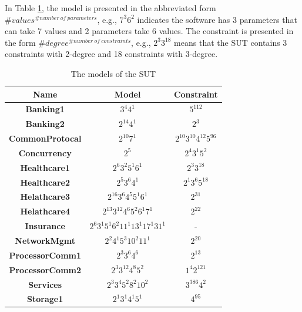\documentclass[conference]{IEEEtran}
\theoremstyle{definition}
\begin{document}
In Table \ref{model_of_sut_of_subjects}, the model is presented in the abbreviated form $\#values^{\#number\ of\ parameters}$, e.g., $7^{3}6^{2}$ indicates the software has 3 parameters that can take 7 values and 2 parameters take 6 values.  The constraint is presented in the form $\#degree^{\#number\ of\ constraints}$, e.g., $2^{3}3^{18}$ means that the SUT contains 3 constraints with  2-degree and 18 constraints with 3-degree.


\begin{table}[!ht]
\caption{The models of the SUT}
\label{model_of_sut_of_subjects}
\center
    \begin{tabular}{|c|c|c|} \hline
    \textbf{Name} & \textbf{Model} & \textbf{Constraint}  \\
    \hline
    \textbf{Banking1} & $3^{4}4^{1}$ & $5^{112}$ \\
    \textbf{Banking2} & $2^{14}4^{1}$ & $2^{3}$ \\
    \textbf{CommonProtocal} & $2^{10}7^{1}$ & $2^{10}3^{10}4^{12}5^{96}$\\
    \textbf{Concurrency} & $2^{5}$ & $2^{4}3^{1}5^{2}$ \\
    \textbf{Healthcare1} & $2^{6}3^{2}5^{1}6^{1}$ & $2^{3}3^{18}$ \\
    \textbf{Healthcare2} & $2^{5}3^{6}4^{1}$ & $2^{1}3^{6}5^{18}$\\
    \textbf{Helathcare3} & $2^{16}3^{6}4^{5}5^{1}6^{1}$ & $2^{31}$ \\
    \textbf{Helathcare4} & $2^{13}3^{12}4^{6}5^{2}6^{1}7^{1}$ & $2^{22}$\\
    \textbf{Insurance} & $2^{6}3^{1}5^{1}6^{2}11^{1}13^{1}17^{1}31^{1}$ & - \\
    \textbf{NetworkMgmt} & $2^{2}4^{1}5^{3}10^{2}11^{1}$ & $2^{20}$\\
    \textbf{ProcessorComm1} & $2^{3}3^{6}4^{6}$ & $2^{13}$ \\
    \textbf{ProcessorComm2} & $2^{3}3^{12}4^{8}5^{2}$ & $1^{4}2^{121}$ \\
    \textbf{Services} & $2^{3}3^{4}5^{2}8^{2}10^{2}$ & $3^{386}4^{2}$ \\
    \textbf{Storage1} & $2^{1}3^{1}4^{1}5^{1}$ & $4^{95}$ \\

\end{tabular}
\end{table}
\end{document}
